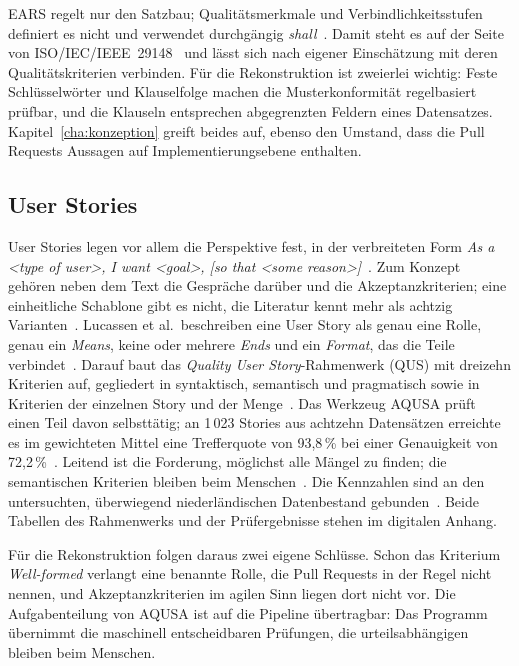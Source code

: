 \documentclass[11pt,a4paper]{report}
\begin{document}
EARS regelt nur den Satzbau; Qualitätsmerkmale und
Verbindlichkeitsstufen definiert es nicht und verwendet durchgängig
\textit{shall}~\cite[Abschn.~4.1]{mavin2009ears}. Damit steht es auf
der Seite von ISO/IEC/IEEE~29148~\cite[Abschn.~5.2.4]{iso29148} und
lässt sich nach eigener Einschätzung mit deren Qualitätskriterien
verbinden. Für die
Rekonstruktion ist zweierlei wichtig: Feste Schlüsselwörter und
Klauselfolge machen die Musterkonformität regelbasiert prüfbar, und die
Klauseln entsprechen abgegrenzten Feldern eines Datensatzes.
Kapitel~\ref{cha:konzeption} greift beides auf, ebenso den Umstand,
dass die Pull Requests Aussagen auf Implementierungsebene enthalten.

\subsection{User Stories}
\label{subsec:userstories}

User Stories legen vor allem die Perspektive fest, in der verbreiteten
Form \textit{As a \textless type of user\textgreater, I want
\textless goal\textgreater, [so that \textless some
reason\textgreater]}~\cite[Abschn.~1]{lucassen2016qus}. Zum Konzept
gehören neben dem Text die Gespräche darüber und die
Akzeptanzkriterien; eine einheitliche Schablone gibt es nicht, die
Literatur kennt mehr als achtzig Varianten~\cite[Abschn.~1 und
2]{lucassen2016qus}. Lucassen et al.\ beschreiben eine User Story als
genau eine Rolle, genau ein \textit{Means}, keine oder mehrere
\textit{Ends} und ein \textit{Format}, das die Teile
verbindet~\cite[Abschn.~2]{lucassen2016qus}. Darauf baut das
\textit{Quality User Story}-Rahmenwerk (QUS) mit dreizehn Kriterien
auf, gegliedert in syntaktisch, semantisch und pragmatisch sowie in
Kriterien der einzelnen Story und der Menge~\cite[Abschn.~3]{lucassen2016qus}.
Das Werkzeug AQUSA prüft einen Teil davon selbsttätig; an 1\,023
Stories aus achtzehn Datensätzen erreichte es im gewichteten Mittel
eine Trefferquote von 93,8\,\% bei einer Genauigkeit von
72,2\,\%~\cite[Tab.~4 und 5]{lucassen2016qus}. Leitend ist die
Forderung, möglichst alle Mängel zu finden; die semantischen
Kriterien bleiben beim Menschen~\cite[Abschn.~4]{lucassen2016qus}. Die
Kennzahlen sind an den untersuchten, überwiegend niederländischen
Datenbestand gebunden~\cite[Abschn.~5.2]{lucassen2016qus}. Beide
Tabellen des Rahmenwerks und der Prüfergebnisse stehen im digitalen
Anhang.

Für die Rekonstruktion folgen daraus zwei eigene Schlüsse. Schon das
Kriterium \textit{Well-formed} verlangt eine benannte Rolle, die
Pull Requests in der Regel nicht nennen, und Akzeptanzkriterien im agilen Sinn liegen dort nicht vor. Die Aufgabenteilung von
AQUSA ist auf die Pipeline übertragbar: Das Programm übernimmt die
maschinell entscheidbaren Prüfungen, die urteilsabhängigen bleiben
beim Menschen.
\end{document}
